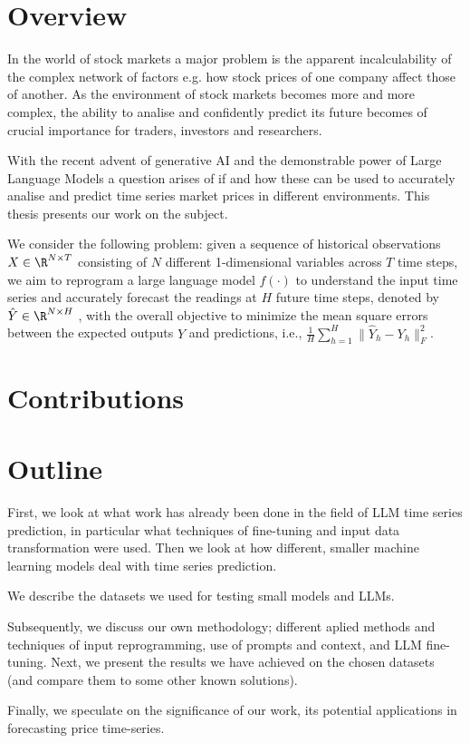 \section{Overview}
In the world of stock markets a major problem is the apparent incalculability of the complex network of factors e.g. how stock prices of one company affect those of another. As the environment of stock markets becomes more and more complex, the ability to analise and confidently predict its future becomes of crucial importance for traders, investors and researchers.

With the recent advent of generative AI and the demonstrable power of Large Language Models a question arises of if and how these can be used to accurately analise and predict time series market prices in different environments. This thesis presents our work on the subject.

We consider the following problem: given a sequence of historical observations \(X \in \R^{N\times T}\)
consisting of \(N\) different 1-dimensional variables across \(T\) time steps, we aim to reprogram a large
language model \(f(\cdot)\) to understand the input time series and accurately forecast the readings at \(H\) future time steps, denoted by \(\hat{Y} \in \R^{N\times H}\) , with the overall objective to minimize the mean square errors between the expected outputs \(Y\) and predictions, i.e., \(\frac1H \sum_{h=1}^H \| \hat{Y}_h - Y_h \|_F^2 \).

\section{Contributions}
\section{Outline}
First, we look at what work has already been done in the field of LLM time series prediction, in particular what techniques of fine-tuning and input data transformation were used. Then we look at how different, smaller machine learning models deal with time series prediction.

We describe the datasets we used for testing small models and LLMs.

Subsequently, we discuss our own methodology; different aplied methods and techniques of input reprogramming, use of prompts and context, and LLM fine-tuning. Next, we present the results we have achieved on the chosen datasets (and compare them to some other known solutions).

Finally, we speculate on the significance of our work, its potential applications in forecasting price time-series.
